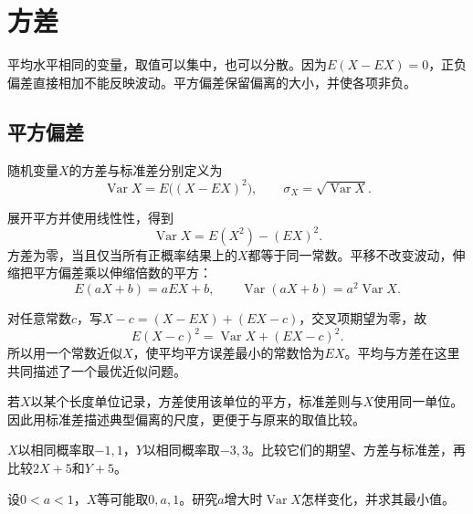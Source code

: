 \FloatBarrier
\newpage
\section{方差}
\label{sec:prob-variance}

平均水平相同的变量，取值可以集中，也可以分散。因为\(E(X-EX)=0\)，正负偏差直接相加不能反映波动。平方偏差保留偏离的大小，并使各项非负。

\subsection{平方偏差}

\begin{definition}
随机变量\(X\)的{\heiti 方差}与{\heiti 标准差}分别定义为
\[
 \operatorname{Var}X=E\bigl((X-EX)^2\bigr),\qquad
 \sigma_X=\sqrt{\operatorname{Var}X}.
\]
\end{definition}

展开平方并使用线性性，得到
\begin{equation}\label{eq:prob-variance-computation}
 \operatorname{Var}X=E(X^2)-(EX)^2.
\end{equation}
方差为零，当且仅当所有正概率结果上的\(X\)都等于同一常数。平移不改变波动，伸缩把平方偏差乘以伸缩倍数的平方：
\begin{equation}\label{eq:prob-variance-affine}
 E(aX+b)=aEX+b,\qquad \operatorname{Var}(aX+b)=a^2\operatorname{Var}X.
\end{equation}

对任意常数\(c\)，写\(X-c=(X-EX)+(EX-c)\)，交叉项期望为零，故
\begin{equation}\label{eq:prob-square-error}
 E(X-c)^2=\operatorname{Var}X+(EX-c)^2.
\end{equation}
所以用一个常数近似\(X\)，使平均平方误差最小的常数恰为\(EX\)。平均与方差在这里共同描述了一个最优近似问题。

若\(X\)以某个长度单位记录，方差使用该单位的平方，标准差则与\(X\)使用同一单位。因此用标准差描述典型偏离的尺度，更便于与原来的取值比较。

\begin{example}
\(X\)以相同概率取\(-1,1\)，\(Y\)以相同概率取\(-3,3\)。比较它们的期望、方差与标准差，再比较\(2X+5\)和\(Y+5\)。
\end{example}

\begin{example}[据2019年浙江卷改编]
设\(0<a<1\)，\(X\)等可能取\(0,a,1\)。研究\(a\)增大时\(\operatorname{Var}X\)怎样变化，并求其最小值。
\end{example}

